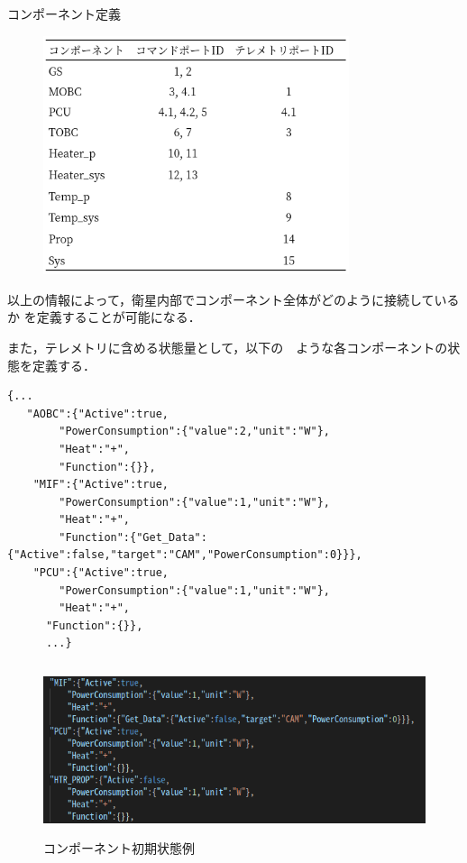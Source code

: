 \documentclass[11pt]{article}
\begin{document}
\begin{table}[H]
   \centering
   \caption{コンポーネント定義} 
   \label{tab:compo_link}
\end{table}
\vspace{-2zh}
\begin{figure}[H]
   \centering
      \includegraphics[height=7cm]{figure/compo_port.png}
\end{figure}

以上の情報によって，衛星内部でコンポーネント全体がどのように接続しているか
を定義することが可能になる．

また，テレメトリに含める状態量として，以下の　ような各コンポーネントの状態を定義する．
\renewcommand{\lstlistingname}{Code}
\begin{lstlisting}[caption=コンポーネント初期状態例,label=compo_sate]
   {...
   "AOBC":{"Active":true,
		"PowerConsumption":{"value":2,"unit":"W"},
		"Heat":"+",
		"Function":{}},
	"MIF":{"Active":true,
		"PowerConsumption":{"value":1,"unit":"W"},
		"Heat":"+",
		"Function":{"Get_Data":{"Active":false,"target":"CAM","PowerConsumption":0}}},
	"PCU":{"Active":true,
		"PowerConsumption":{"value":1,"unit":"W"},
		"Heat":"+",
      "Function":{}},
      ...}
\end{lstlisting}
\begin{figure}[H]
   \centering
      \includegraphics[height=5.0cm]{figure/Component_state.png}
      \caption{コンポーネント初期状態例}
      \label{fig:Compo_state}
\end{figure}
\end{document}
